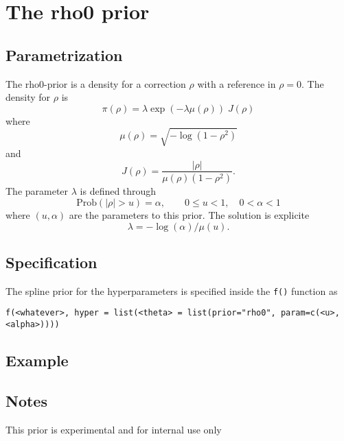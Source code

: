 \documentclass[a4paper,11pt]{article}
\begin{document}
\section*{The rho0 prior}

\subsection*{Parametrization}
The rho0-prior is a density for a correction $\rho$ with a reference
in $\rho=0$. The density for $\rho$ is
\begin{displaymath}
    \pi(\rho) = \lambda \exp(-\lambda \mu(\rho)) \; J(\rho)
\end{displaymath}
where
\begin{displaymath}
    \mu(\rho) = \sqrt{-\log(1-\rho^{2})}
\end{displaymath}
and
\begin{displaymath}
    J(\rho) = \frac{|\rho|}{\mu(\rho) (1-\rho^{2})}.
\end{displaymath}
The parameter $\lambda$ is defined through
\begin{displaymath}
    \text{Prob}( |\rho| > u) = \alpha, \qquad 0 \le u < 1, \quad 0<\alpha<1
\end{displaymath}
where $(u, \alpha{})$ are the parameters to this prior. The solution
is explicite 
\begin{displaymath}
    \lambda = -\log(\alpha)/\mu(u).
\end{displaymath}

\subsection*{Specification}
The spline prior for the hyperparameters is specified inside the
{\tt f()} function as 
\begin{center}
    {\tt f(<whatever>, hyper = list(<theta> =
        list(prior="rho0", param=c(<u>,<alpha>))))}
\end{center}

\subsection*{Example}

\subsection*{Notes}
This prior is experimental and for internal use only
\end{document}

